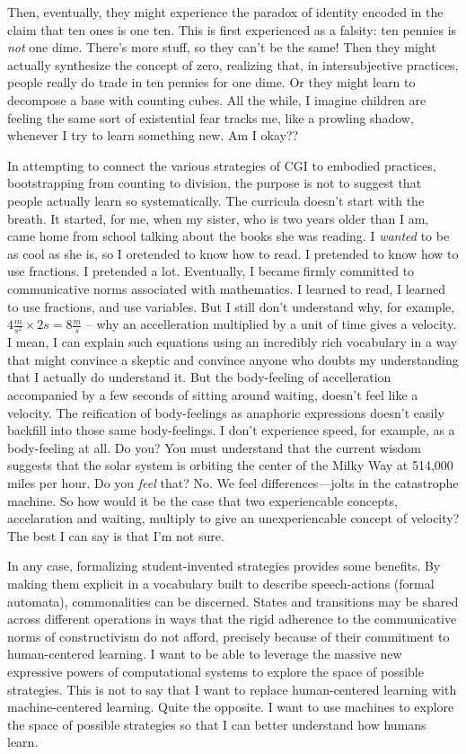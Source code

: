\documentclass[12pt]{book}
\begin{document}
Then, eventually, they might experience the paradox of identity encoded in the claim that ten ones is one ten. This is first experienced as a falsity: ten pennies is \textit{not} one dime. There's more stuff, so they can't be the same! Then they might actually synthesize the concept of zero, realizing that, in intersubjective practices, people really do trade in ten pennies for one dime. Or they might learn to decompose a base with counting cubes. All the while, I imagine children are feeling the same sort of existential fear tracks me, like a prowling shadow, whenever I try to learn something new. Am I okay?? 


In attempting to connect the various strategies of CGI to embodied practices, bootstrapping from counting to division, the purpose is not to suggest that people actually learn so systematically. The curricula doesn't start with the breath. It started, for me, when my sister, who is two years older than I am, came home from school talking about the books she was reading. I \textit{wanted} to be as cool as she is, so I oretended to know how to read. I pretended to know how to use fractions. I pretended a lot. Eventually, I became firmly committed to communicative norms associated with mathematics. I learned to read, I learned to use fractions, and use variables. But I still don't understand why, for example, $4 \frac{m}{s^2}\times 2 s = 8 \frac{m}{s}$ -- why an accelleration multiplied by a unit of time gives a velocity. I mean, I can explain such equations using an incredibly rich vocabulary in a way that might convince a skeptic and convince anyone who doubts my understanding that I actually do understand it. But the body-feeling of accelleration accompanied by a few seconds of sitting around waiting, doesn't feel like a velocity. The reification of body-feelings as anaphoric expressions doesn't easily backfill into those same body-feelings. I don't experience speed, for example, as a body-feeling at all. Do you? You must understand that the current wisdom suggests that the solar system is orbiting the center of the Milky Way at 514,000 miles per hour. Do you \textit{feel} that? No. We feel differences---jolts in the catastrophe machine. So how would it be the case that two experiencable concepts, accelaration and waiting, multiply to give an unexperiencable concept of velocity? The best I can say is that I'm not sure. 

In any case, formalizing student-invented strategies provides some benefits. By making them explicit in a vocabulary built to describe speech-actions (formal automata), commonalities can be discerned. States and transitions may be shared across different operations in ways that the rigid adherence to the communicative norms of constructivism do not afford, precisely because of their commitment to human-centered learning. I want to be able to leverage the massive new expressive powers of computational systems to explore the space of possible strategies. This is not to say that I want to replace human-centered learning with machine-centered learning. Quite the opposite. I want to use machines to explore the space of possible strategies so that I can better understand how humans learn.
\end{document}
